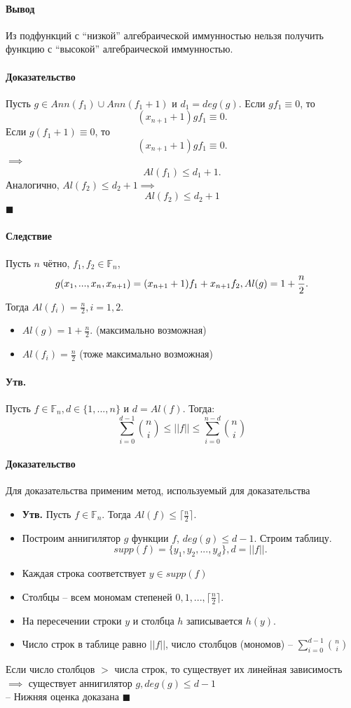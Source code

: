 \documentclass[a4paper,12pt]{article}
\newcommand{\statement}[1]{\stepcounter{paragraph}\paragraph{Утв.} #1}
\newcommand{\proof}{\paragraph{Доказательство}}
\begin{document}
        \paragraph{Вывод} Из подфункций с ``низкой'' алгебраической
        иммунностью нельзя получить функцию с ``высокой''
        алгебраической иммунностью.
        \proof Пусть $g \in Ann(f_1) \cup Ann(f_1 + 1)$ и $d_1 =
        deg(g)$. Если $gf_1 \equiv 0$, то \[ (x_{n+1} + 1)gf_1 \equiv
          0. \]
        Если $g(f_1 + 1) \equiv 0$, то \[ (x_{n+1} + 1)gf_1 \equiv
          0. \] $\implies$ \[ Al(f_1) \leq d_1 + 1. \]
        Аналогично, $Al(f_2) \leq d_2 + 1 \implies$ \[ Al(f_2) \leq
          d_2 + 1 \]
        $\blacksquare$
        \paragraph{Следствие} Пусть $n$ чётно, $f_1, f_2 \in
        \mathbb{F}_n$, \[g(x_1, ..., x_n, x_{n+1}) = (x_{n+1} + 1)f_1
          + x_{n+1}f_2, \\ Al(g) = 1 + \frac{n}{2}. \]
        Тогда $Al(f_i) = \frac{n}{2}, i = 1, 2.$
        \begin{itemize}
          \item $Al(g) = 1 + \frac{n}{2}.$ (максимально возможная)
          \item $Al(f_i) = \frac{n}{2}$ (тоже максимально возможная)
        \end{itemize}

        \statement{Пусть $f \in \mathbb{F}_n, d \in \{1, ..., n\}$ и
          $d = Al(f)$. Тогда: \[ \sum_{i=0}^{d-1} \binom{n}{i} \leq
            ||f|| \leq \sum_{i=0}^{n-d} \binom{n}{i} \]}
        \proof Для доказательства применим метод, используемый для
        доказательства
        \begin{itemize}
          \item \textbf{Утв.} Пусть $f \in \mathbb{F}_n$. Тогда $Al(f)
              \leq \lceil \frac{n}{2} \rceil$.
          \item Построим аннигилятор $g$ функции $f$, $deg(g) \leq d -
            1$.
            Строим таблицу. \[ supp(f) = \{y_1, y_2, ..., y_d\}, d =
              ||f||. \]
          \item Каждая строка соответствует $y \in supp(f)$
          \item Столбцы -- всем мономам степеней $0, 1, ..., \lceil
            \frac{n}{2} \rceil$.
          \item На пересечении строки $y$ и столбца $h$ записывается
            $h(y)$.
          \item Число строк в таблице равно $||f||$, число столбцов
            (мономов) -- $\sum_{i=0}^{d-1} \binom{n}{i}$
        \end{itemize}
        Если число столбцов $>$ числа строк, то существует их линейная
        зависимость $\implies$ существует аннигилятор $g, deg(g) \leq
        d - 1$\\
        -- Нижняя оценка доказана $\blacksquare$
\end{document}
